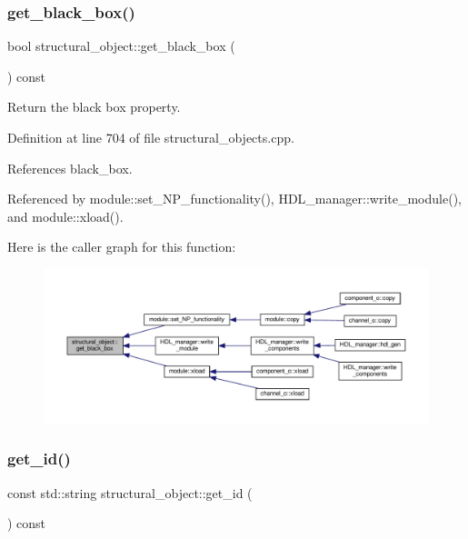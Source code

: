 \subsubsection{\texorpdfstring{get\+\_\+black\+\_\+box()}{get\_black\_box()}}
{\footnotesize\ttfamily bool structural\+\_\+object\+::get\+\_\+black\+\_\+box (\begin{DoxyParamCaption}{ }\end{DoxyParamCaption}) const}



Return the black box property. 



Definition at line 704 of file structural\+\_\+objects.\+cpp.



References black\+\_\+box.



Referenced by module\+::set\+\_\+\+N\+P\+\_\+functionality(), H\+D\+L\+\_\+manager\+::write\+\_\+module(), and module\+::xload().

Here is the caller graph for this function\+:
\nopagebreak
\begin{figure}[H]
\begin{center}
\leavevmode
\includegraphics[width=350pt]{d8/da3/classstructural__object_ad191c9ede27d8f1aab98cbf72343ba03_icgraph}
\end{center}
\end{figure}
\mbox{\label{classstructural__object_a53e1999ebc946f37a981507d4ef72650}} 
\subsubsection{\texorpdfstring{get\+\_\+id()}{get\_id()}}
{\footnotesize\ttfamily const std\+::string structural\+\_\+object\+::get\+\_\+id (\begin{DoxyParamCaption}{ }\end{DoxyParamCaption}) const}



